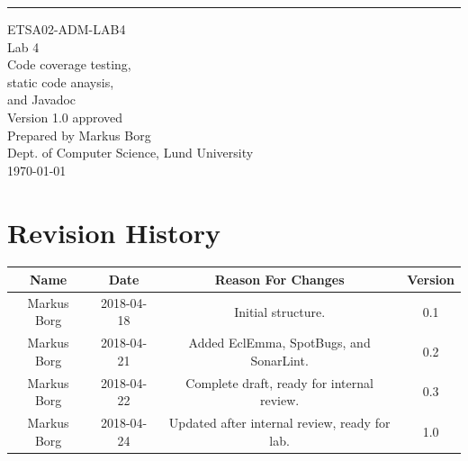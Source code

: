 \documentclass{scrreprt}
\date{}
\def\myversion{1.0 }
\begin{document}
\begin{flushright}
    \rule{16cm}{5pt}\vskip1cm
    \begin{bfseries}
    	\LARGE{ETSA02-ADM-LAB4}\\
    	\vspace{1.5cm}
        \Huge{Lab 4}\\
        \vspace{0.5cm}
        Code coverage testing,\\
        \vspace{0.5cm}
        static code anaysis,\\
        \vspace{0.5cm}
        and Javadoc\\
        \vspace{1.5cm}
        \LARGE{Version \myversion approved}\\
        \vspace{1.5cm}
        Prepared by Markus Borg\\
        Dept. of Computer Science, Lund University\\
        \vspace{1.5cm}
        \today\\
    \end{bfseries}
\end{flushright}


\chapter*{Revision History}

\begin{center}
    \begin{tabular}{|c|c|c|c|}
        \hline
	    Name & Date & Reason For Changes & Version\\
        \hline
	    Markus Borg & 2018-04-18 & Initial structure. & 0.1\\
        \hline
        Markus Borg & 2018-04-21 & Added EclEmma, SpotBugs, and SonarLint. & 0.2\\
        \hline
        Markus Borg & 2018-04-22 & Complete draft, ready for internal review. & 0.3\\
        \hline
        Markus Borg & 2018-04-24 & Updated after internal review, ready for lab. & 1.0\\
        \hline
    \end{tabular}
\end{center}
\end{document}
